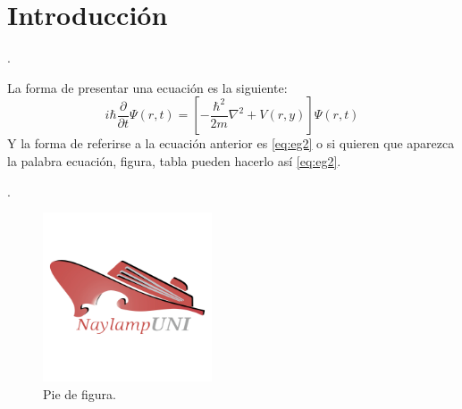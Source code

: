 \documentclass[11pt,letterpaper,twocolumn]{article}
\begin{document}
\section{Introducción}
\lipsum[1].\par
La forma de presentar una ecuación es la siguiente: 
\begin{equation}
    \label{eq:eg2}
    i \hbar \frac{\partial}{\partial t} \Psi (r,t)= \left[ -\frac{\hbar^{2}}{2m} \nabla^{2} +V(r,y)\right] \Psi (r,t)
\end{equation}
Y la forma de referirse a la ecuación anterior es \ref{eq:eg2} o si quieren que aparezca la palabra ecuación, figura, tabla pueden hacerlo así \autoref{eq:eg2}. \par 

\lipsum[2].\par 
 
\begin{table}[H]
	\begin{center}
	\end{center}
	\label{cua:1}
	\caption{Valores de distancias y diámetros respectivos}
\end{table}
\lipsum[1-3]

\begin{figure}[ht]
    \centering
    \includegraphics[width=5cm]{figuras/NU_Logo.png} 
    \caption{Pie de figura.}
    \label{fig:my_label}
\end{figure}
\end{document}

